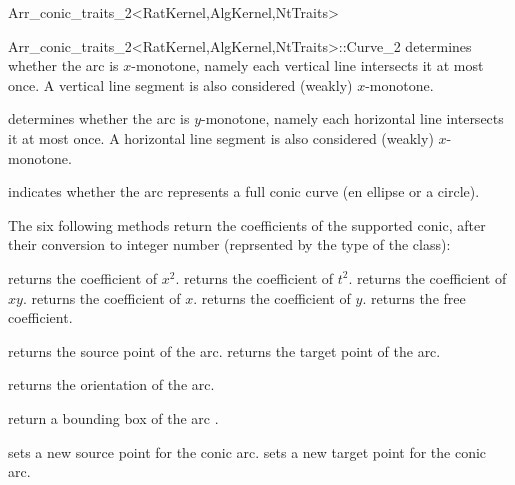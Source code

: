 \begin{ccRefClass}{Arr_conic_traits_2<RatKernel,AlgKernel,NtTraits>}
\begin{ccClass}{Arr_conic_traits_2<RatKernel,AlgKernel,NtTraits>::Curve_2}
  {determines whether the arc is $x$-monotone, namely each vertical line
   intersects it at most once. A vertical line segment is also considered
   (weakly) $x$-monotone.}

  {determines whether the arc is $y$-monotone, namely each horizontal line
   intersects it at most once. A horizontal line segment is also considered
   (weakly) $x$-monotone.}

  {indicates whether the arc represents a full conic curve (en ellipse or
   a circle).}

The six following methods return the coefficients of the supported conic,
after their conversion to integer number (reprsented by the 
type of the  class):


  {returns the coefficient of $x^2$.}
\ccGlue
{}
  {returns the coefficient of $t^2$.}
\ccGlue
{}
  {returns the coefficient of $x y$.}
\ccGlue
{}
  {returns the coefficient of $x$.}
\ccGlue
{}
  {returns the coefficient of $y$.}
\ccGlue
{}
  {returns the free coefficient.}


  {returns the source point of the arc.
   }
\ccGlue
{}
  {returns the target point of the arc.
   }

  {returns the orientation of the arc.}

  {return a bounding box of the arc \ccVar{}.}


\ccOperations

  {sets a new source point for the conic arc.
   }
\ccGlue
{}
  {sets a new target point for the conic arc.
   }


\end{ccClass}
\end{ccRefClass}
